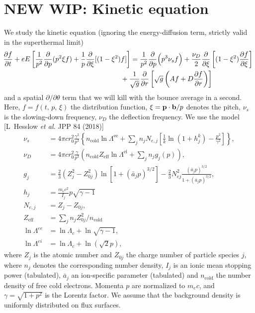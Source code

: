\documentclass[11pt,a4paper]{article}
\newcommand{\sub}[1]{\ensuremath{_{\text{#1}}}}
\renewcommand{\b}[1]{\ensuremath{ {\bf #1 } }}
\begin{document}
\section{NEW WIP: Kinetic equation}
We study the kinetic equation (ignoring the energy-diffusion term, strictly valid in the superthermal limit) 
\begin{align}
\hspace{-1mm}\frac{\partial f}{\partial t} + eE\left[\frac{1}{p^2}\frac{\partial}{\partial p}(p^2\xi f)  + \frac{1}{p}\frac{\partial}{\partial \xi}[(1-\xi^2) f]\right] &= \frac{1}{p^2}\frac{\partial}{\partial p}\Big(p^3 \nu_s  f\Big) + \frac{\nu_D}{2}\frac{\partial}{\partial \xi}\left[(1-\xi^2)\frac{\partial f}{\partial \xi}\right] \nonumber \\
&\hspace{-5mm} + \frac{1}{\sqrt{g}}\frac{\partial}{\partial r}\left[ \sqrt{g}\left( Af+D\frac{\partial f}{\partial r}\right)\right]
\end{align}
and a spatial $\partial/\partial \theta$ term that we will kill with the bounce average in a second.
Here, $f=f(t,\,p,\,\xi)$ the distribution function, $\xi = \b{p}\cdot\b{b}/p$ denotes the pitch, $\nu_s$ is the slowing-down frequency, $\nu_D$ the deflection frequency. We use the model [L~Hesslow \emph{et al.} JPP 84 (2018)]
\begin{align}
\nu_s &= 4\pi c r_0^2 \frac{\gamma^2}{p^3} \left\{n\sub{cold} \ln\Lambda^\text{ee} + \sum_j n_j N_{e,j}\left[\frac{1}{k}\ln(1+ h_j^k)  - \frac{p^2}{\gamma^2}\right]\right\} , \nonumber \\
\nu_D &= 4\pi c r_0^2\frac{\gamma}{p^3} \left( n\sub{cold} Z\sub{eff} \ln\Lambda^\text{ei} + \sum_j n_j g_j(p) \right), \nonumber \\
g_j &= \frac{2}{3} (Z_j^2-Z_{0j}^2)\ln[1+ (\bar{a}_jp)^{3/2}] - \frac{2}{3}N_{ej}^2\frac{(\bar{a}_j p)^{3/2}}{1+(\bar{a}_j p)^{3/2}}, \nonumber \\
h_j &= \frac{m_e c^2}{I_j}p\sqrt{\gamma-1}\nonumber \\
N_{e,j} &= Z_j-Z_{0j}, \nonumber \\
Z\sub{eff} &= \sum_j n_j Z_{0j}^2/n\sub{cold}  \nonumber \\
\ln\Lambda^{ee} &= \ln\Lambda_c + \ln\sqrt{\gamma-1}, \nonumber \\
\ln\Lambda^{ei} &= \ln\Lambda_c + \ln(\sqrt{2}p), 
\end{align}
where $Z_j$ is the atomic number and $Z_{0j}$ the charge number of particle species $j$, where $n_j$ denotes the corresponding number density, $I_j$ is an ionic mean stopping power (tabulated), $\bar{a}_j$ an ion-specific parameter (tabulated) and $n\sub{cold}$ the number density of free cold electrons. Momenta $p$ are normalized to $m_e c$, and $\gamma = \sqrt{1+p^2}$ is the Lorentz factor. We assume that the background density is uniformly distributed on flux surfaces.
\end{document}
